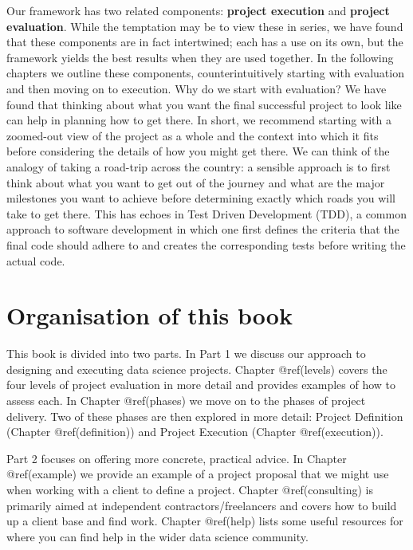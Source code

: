\documentclass[]{book}
\begin{document}
Our framework has two related components: \textbf{project execution} and
\textbf{project evaluation}. While the temptation may be to view these
in series, we have found that these components are in fact intertwined;
each has a use on its own, but the framework yields the best results
when they are used together. In the following chapters we outline these
components, counterintuitively starting with evaluation and then moving
on to execution. Why do we start with evaluation? We have found that
thinking about what you want the final successful project to look like
can help in planning how to get there. In short, we recommend starting
with a zoomed-out view of the project as a whole and the context into
which it fits before considering the details of how you might get there.
We can think of the analogy of taking a road-trip across the country: a
sensible approach is to first think about what you want to get out of
the journey and what are the major milestones you want to achieve before
determining exactly which roads you will take to get there. This has
echoes in Test Driven Development (TDD), a common approach to software
development in which one first defines the criteria that the final code
should adhere to and creates the corresponding tests before writing the
actual code.

\hypertarget{organisation-of-this-book}{%
\section{Organisation of this book}\label{organisation-of-this-book}}

This book is divided into two parts. In Part 1 we discuss our approach
to designing and executing data science projects. Chapter @ref(levels)
covers the four levels of project evaluation in more detail and provides
examples of how to assess each. In Chapter @ref(phases) we move on to
the phases of project delivery. Two of these phases are then explored in
more detail: Project Definition (Chapter @ref(definition)) and Project
Execution (Chapter @ref(execution)).

Part 2 focuses on offering more concrete, practical advice. In Chapter
@ref(example) we provide an example of a project proposal that we might
use when working with a client to define a project. Chapter
@ref(consulting) is primarily aimed at independent
contractors/freelancers and covers how to build up a client base and
find work. Chapter @ref(help) lists some useful resources for where you
can find help in the wider data science community.
\end{document}
